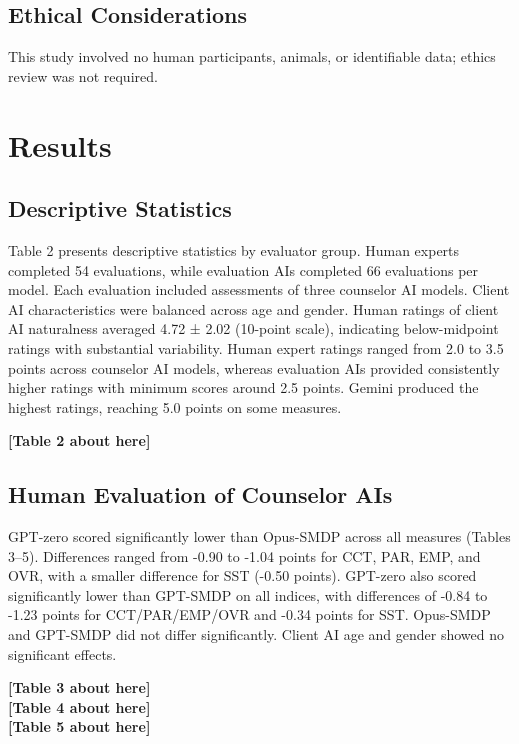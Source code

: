\documentclass{wiley-article}
\begin{document}
\subsection*{Ethical Considerations}
This study involved no human participants, animals, or identifiable data; ethics review was not required.




\section*{Results}

\subsection*{Descriptive Statistics}

Table 2 presents descriptive statistics by evaluator group. Human experts completed 54 evaluations, while evaluation AIs completed 66 evaluations per model. Each evaluation included assessments of three counselor AI models. Client AI characteristics were balanced across age and gender. Human ratings of client AI naturalness averaged 4.72 ± 2.02 (10-point scale), indicating below-midpoint ratings with substantial variability. Human expert ratings ranged from 2.0 to 3.5 points across counselor AI models, whereas evaluation AIs provided consistently higher ratings with minimum scores around 2.5 points. Gemini produced the highest ratings, reaching 5.0 points on some measures.

\begin{center}
\textbf{[Table 2 about here]}
\end{center}

\subsection*{Human Evaluation of Counselor AIs}

GPT-zero scored significantly lower than Opus-SMDP across all measures (Tables 3–5). Differences ranged from -0.90 to -1.04 points for CCT, PAR, EMP, and OVR, with a smaller difference for SST (-0.50 points). GPT-zero also scored significantly lower than GPT-SMDP on all indices, with differences of -0.84 to -1.23 points for CCT/PAR/EMP/OVR and -0.34 points for SST. Opus-SMDP and GPT-SMDP did not differ significantly. Client AI age and gender showed no significant effects.

\begin{center}
\textbf{[Table 3 about here]}\\
\textbf{[Table 4 about here]}\\
\textbf{[Table 5 about here]}
\end{center}
\end{document}

